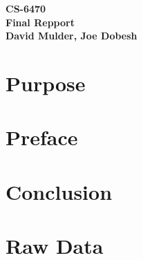 \documentclass{report}
\begin{document}
\begin{center}
\textbf{CS-6470\\Final Repport\\ David Mulder, Joe Dobesh}
\end{center}

\section{Purpose}


\section{Preface}


\section{Conclusion}


\section{Raw Data}
\end{document}

